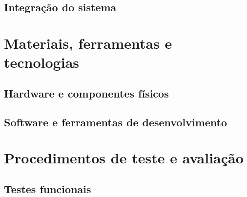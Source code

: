 \subsection{Integração do sistema}
\label{subsec:integracao-sistema}


\section{Materiais, ferramentas e tecnologias}
\label{sec:materiais-ferramentas}


\subsection{Hardware e componentes físicos}
\label{subsec:hardware}


\subsection{Software e ferramentas de desenvolvimento}
\label{subsec:software}


\section{Procedimentos de teste e avaliação}
\label{sec:procedimentos-avaliacao}


\subsection{Testes funcionais}
\label{subsec:testes-funcionais}

